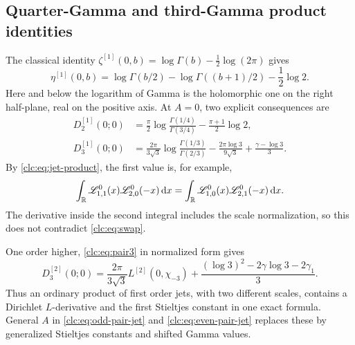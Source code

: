 \subsection{Quarter-Gamma and third-Gamma product identities}
The classical identity
$\zeta^{[1]}(0,b)=\log\Gamma(b)-\tfrac12\log(2\pi)$
\cite{DLMF25} gives
\begin{equation}\label{clc:eq:eta-zerojet}
 \eta^{[1]}(0,b)=\log\Gamma(b/2)-\log\Gamma((b+1)/2)
                              -\frac12\log2.
\end{equation}
Here and below the logarithm of Gamma is the holomorphic one on the
right half-plane, real on the positive axis.
At $A=0$, two explicit consequences are
\begin{align}
 D_2^{[1]}(0;0)
 &=\frac\pi2\log\frac{\Gamma(1/4)}{\Gamma(3/4)}
                  -\frac{\pi+1}{2}\log2,\label{clc:eq:quarter}\\
 D_3^{[1]}(0;0)
 &=\frac{2\pi}{3\sqrt3}\log\frac{\Gamma(1/3)}{\Gamma(2/3)}
   -\frac{2\pi\log3}{9\sqrt3}+\frac{\gamma-\log3}{3}.
 \label{clc:eq:third}
\end{align}
By \eqref{clc:eq:jet-product}, the first value is, for example,
\[
 \int_\mathbb R\mathscr L_{1,1}^{0}(x)\mathscr L_{2,0}^{0}(-x)\,\mathrm d x
 =\int_\mathbb R\mathscr L_{1,0}^{0}(x)\mathscr L_{2,1}^{0}(-x)\,\mathrm d x.
\]
The derivative inside the second integral includes the scale
normalization, so this does not contradict \eqref{clc:eq:swap}.

One order higher, \eqref{clc:eq:pair3} in normalized form gives
\begin{equation}\label{clc:eq:third2}
 D_3^{[2]}(0;0)=\frac{2\pi}{3\sqrt3}L^{[2]}(0,\chi_{-3})
       +\frac{(\log3)^2-2\gamma\log3-2\gamma_1}{3}.
\end{equation}
Thus an ordinary product of first order jets, with two different scales,
contains a Dirichlet $L$-derivative and the first Stieltjes constant in
one exact formula. General $A$ in \eqref{clc:eq:odd-pair-jet} and
\eqref{clc:eq:even-pair-jet} replaces these by generalized Stieltjes
constants and shifted Gamma values.
